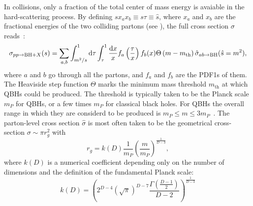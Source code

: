 In \pp collisions, only a fraction of the total center of mass energy \sqs is avaiable in the hard-scattering process. By defining \(sx_ax_b \equiv s \tau \equiv \hat{s}\), where \(x_a\) and \(x_b\) are the fractional energies of the two colliding partons (see \Sect{\ref{subsec:theory:sm:hadron_interactions}}), the full cross section \(\sigma\) reads~\cite{Gingrich_Undseth-2020}:
\begin{equation*}
    \sigma_{pp \rightarrow \text{BH} + X}(s) =
    \sum_{a,b}
        \int_{m^2/s}^{1} \dd{\tau}
            \int_{\tau}^{1}
            \frac{\dd{x}}{x}
            f_a\left(\frac{\tau}{x}\right)
            f_b(x)
            \Theta\left(m - m_{\text{th}}\right)
            \hat{\sigma}_{ab\rightarrow \text{BH}} (\hat{s} = m^2),
\end{equation*}
where \(a\) and \(b\) go through all the partons, and \(f_a\) and \(f_b\) are the \acp{PDF1} of them. The Heaviside step function \(\Theta\) marks the minimum mass threshold \(m_{\text{th}}\) at which \acp{QBH} could be produced.
The threshold is typically taken to be the Planck scale \(m_P\) for \acp{QBH}, or a few times \(m_P\) for classical black holes. For \acp{QBH} the overall range in which they are considerd to be produced is \(m_P \leq m \leq 3m_P\)~\cite{Gingrich-2010}.
The parton-level cross section \(\hat{\sigma}\) is most often taken to be the geometrical cross-section \(\sigma \sim \pi r_g^2\) with
\begin{equation*}
    r_g = k(D) \frac{1}{m_P} \left(\frac{m}{m_P}\right)^{\frac{1}{D-3}},
\end{equation*}
where \(k(D)\) is a numerical coefficient depending only on the number of dimensions and the definition of the fundamental Planck scale:
\begin{equation*}
    k(D) = 
    \left(
        2^{D-4}
        \left(\sqrt{\pi}\right)^{D-7}
        \frac{\Gamma \left(\frac{D-1}{2}\right)}{D-2}
    \right)
    ^{\frac{1}{D-3}}
\end{equation*}

